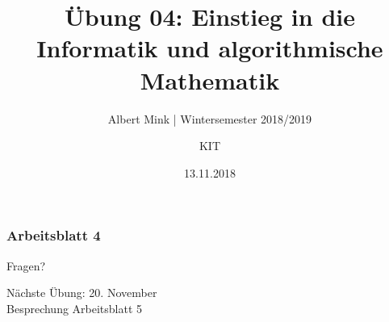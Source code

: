 \documentclass[c,18pt]{beamer}
\date{13.11.2018}
\title[Übung 04: Einstieg in die Informatik und algorithmische Mathematik]
  {Übung 04: Einstieg in die Informatik und algorithmische Mathematik}
\subtitle{Albert Mink | Wintersemester 2018/2019}
\author[Albert Mink, ]{KIT}
\institute[Institut für Angewandte und Numerische Mathematik (IANM)]{Institut für Angewandte und Numerische Mathematik}
\begin{document}
\begin{frame}
  \maketitle
\end{frame}

\begin{frame}
  \frametitle{Arbeitsblatt 4}%
\tableofcontents[hideallsubsections]
\end{frame}
\setcounter{exercise}{11}

\def\kap{1}
\setcounter{exercise}{14}
\setcounter{exercise}{15}
\setcounter{exercise}{16}

\begin{frame}
\centering
\Huge\textcolor{KITgreen}{Fragen?}
\vspace{2cm}

{\LARGE
N\"achste \"Ubung: 20. November\\
Besprechung Arbeitsblatt 5
}
\end{frame}


\end{document}

